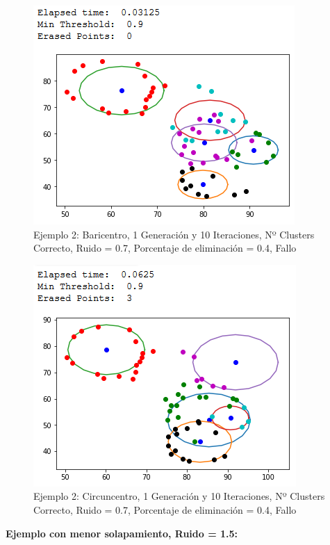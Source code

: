 \documentclass[conference,a4paper]{IEEEtran}
\begin{document}
\begin{figure}[H]
\centering
\includegraphics[scale=0.65]{Experimentacion/Ejemplo2/ej2_b_1_10_re_wrong}
\caption{Ejemplo 2: Baricentro, 1 Generación y 10 Iteraciones,  Nº Clusters Correcto, Ruido = 0.7, Porcentaje de eliminación = 0.4, Fallo\\}
\end{figure}

\begin{figure}[H]
\centering
\includegraphics[scale=0.65]{Experimentacion/Ejemplo2/ej2_c_1_10_re_wrong}
\caption{Ejemplo 2: Circuncentro, 1 Generación y 10 Iteraciones,  Nº Clusters Correcto, Ruido = 0.7, Porcentaje de eliminación = 0.4, Fallo\\}
\end{figure}

\textbf{Ejemplo con menor solapamiento, Ruido = 1.5:}\\
\end{document}
